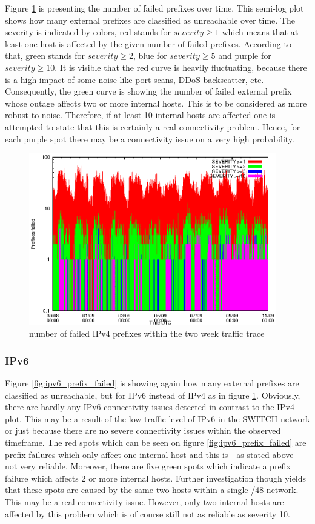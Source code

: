 Figure \ref{fig:ipv4_prefix_failed} is presenting the number of failed prefixes over time. This semi-log plot shows how many external prefixes are classified as unreachable over time. The severity is indicated by colors, red stands for $severity \ge 1$ which means that at least one host is affected by the given number of failed prefixes. According to that, green stands for $severity \ge 2$, blue for $severity \ge 5$ and purple for $severity \ge 10$. It is visible that the red curve is heavily fluctuating, because there is a high impact of some noise like port scans, DDoS backscatter, etc. Consequently, the green curve is showing the number of failed external prefix whose outage affects two or more internal hosts. This is to be considered as more robust to noise. Therefore, if at least 10 internal hosts are affected one is attempted to state that this is certainly a real connectivity problem. Hence, for each purple spot there may be a connectivity issue on a very high probability.
\begin{figure}[hb!]
	\centering
	\includegraphics[height=75mm]{images/prefix_failed_ipv4.eps}
	\caption{number of failed IPv4 prefixes within the two week traffic trace}
	\label{fig:ipv4_prefix_failed}
\end{figure}

\subsubsection{IPv6}
Figure \ref{fig:ipv6_prefix_failed} is showing again how many external prefixes are classified as unreachable, but for IPv6 instead of IPv4 as in figure \ref{fig:ipv4_prefix_failed}. Obviously, there are hardly any IPv6 connectivity issues detected in contrast to the IPv4 plot. This may be a result of the low traffic level of IPv6 in the SWITCH network or just because there are no severe connectivity issues within the observed timeframe. The red spots which can be seen on figure \ref{fig:ipv6_prefix_failed} are prefix failures which only affect one internal host and this is - as stated above - not very reliable. Moreover, there are five green spots which indicate a prefix failure which affects 2 or more internal hosts. Further investigation though yields that these spots are caused by the same two hosts within a single /48 network. This may be a real connectivity issue. However, only two internal hosts are affected by this problem which is of course still not as reliable as severity 10.

